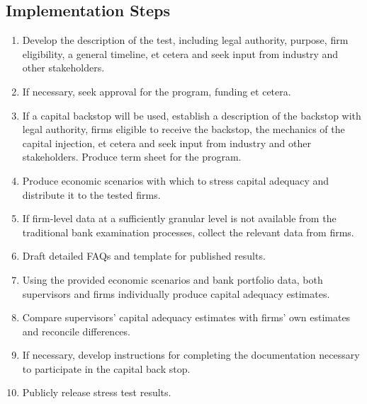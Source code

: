 \documentclass[12pt]{article}
\begin{document}
\subsection{Implementation Steps}

\begin{enumerate}

\item Develop the description of the test, including legal authority, purpose, firm eligibility, a general timeline, et cetera and seek input from industry and other stakeholders.
\item If necessary, seek approval for the program, funding et cetera.
\item If a capital backstop will be used, establish a description of the backstop with legal authority, firms eligible to receive the backstop, the mechanics of the capital injection, et cetera and seek input from industry and other stakeholders. Produce term sheet for the program.
\item Produce economic scenarios with which to stress capital adequacy and distribute it to the tested firms.
\item If firm-level data at a sufficiently granular level is not available from the traditional bank examination processes, collect the relevant data from firms.
\item Draft detailed FAQs and template for published results.
\item Using the provided economic scenarios and bank portfolio data, both supervisors and firms individually produce capital adequacy estimates.
\item Compare supervisors' capital adequacy estimates with firms' own estimates and reconcile differences.
\item If necessary, develop instructions for completing the documentation necessary to participate in the capital back stop.
\item Publicly release stress test results.

\end{enumerate}

\end{document}
